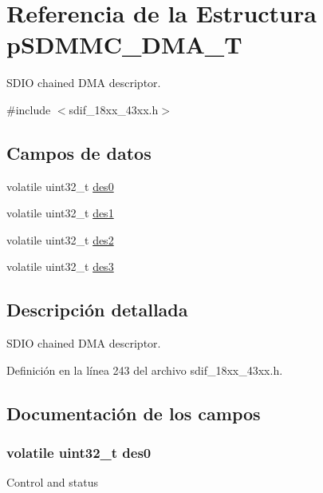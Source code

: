 \hypertarget{structp_s_d_m_m_c___d_m_a___t}{}\section{Referencia de la Estructura p\+S\+D\+M\+M\+C\+\_\+\+D\+M\+A\+\_\+T}
\label{structp_s_d_m_m_c___d_m_a___t}


S\+D\+IO chained D\+MA descriptor.  




{\ttfamily \#include $<$sdif\+\_\+18xx\+\_\+43xx.\+h$>$}

\subsection*{Campos de datos}
\begin{DoxyCompactItemize}
\item 
volatile uint32\+\_\+t \hyperlink{structp_s_d_m_m_c___d_m_a___t_afd5e4cac1129d6b16399bbac555a8fd6}{des0}
\item 
volatile uint32\+\_\+t \hyperlink{structp_s_d_m_m_c___d_m_a___t_adffc8c6c1a159b5f6377e98ad54cc265}{des1}
\item 
volatile uint32\+\_\+t \hyperlink{structp_s_d_m_m_c___d_m_a___t_add829c6161aaea38a87efe8524e7c044}{des2}
\item 
volatile uint32\+\_\+t \hyperlink{structp_s_d_m_m_c___d_m_a___t_acfa980823f7205141925661794c6396b}{des3}
\end{DoxyCompactItemize}


\subsection{Descripción detallada}
S\+D\+IO chained D\+MA descriptor. 

Definición en la línea 243 del archivo sdif\+\_\+18xx\+\_\+43xx.\+h.



\subsection{Documentación de los campos}
\subsubsection[{\texorpdfstring{des0}{des0}}]{\setlength{\rightskip}{0pt plus 5cm}volatile uint32\+\_\+t des0}\hypertarget{structp_s_d_m_m_c___d_m_a___t_afd5e4cac1129d6b16399bbac555a8fd6}{}\label{structp_s_d_m_m_c___d_m_a___t_afd5e4cac1129d6b16399bbac555a8fd6}
Control and status 

